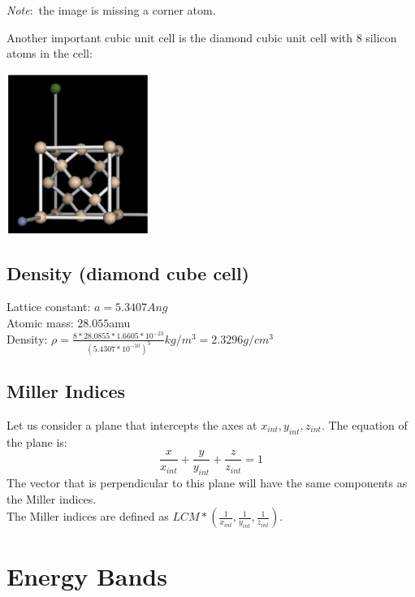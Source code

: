 \documentclass[nobib]{tufte-handout}
\newcommand{\note}[1]{
        \begin{notebox}
        \noindent\textit{Note}:\ #1
        \end{notebox}
}
\begin{document}
\note{the image is missing a corner atom.}
Another important cubic unit cell is the diamond cubic unit cell with 8 silicon atoms in the cell:
\begin{center}
    \includegraphics[width = 175px]{images/diamond_cube_cell.png}
\end{center}
\subsection{Density (diamond cube cell)}
Lattice constant: $a=5.3407Ang$\\
Atomic mass: $28.055$amu\\
Density: $\rho = \frac{8*28.0855*1.6605*10^{-23}}{(5.4307*10^{-10})^3}kg/m^3 = 2.3296g/cm^3$
\subsection{Miller Indices}
Let us consider a plane that intercepts the axes at $x_{int}, y_{int}, z_{int}$.
The equation of the plane is:
\begin{equation*}
    \frac{x}{x_{int}}+\frac{y}{y_{int}}+\frac{z}{z_{int}} = 1
\end{equation*}
The vector that is perpendicular to this plane will have the same components as the Miller indices.\\
The Miller indices are defined as $LCM*(\frac{1}{x_{int}},\frac{1}{y_{int}},\frac{1}{z_{int}})$.
\section{Energy Bands}
\end{document}
